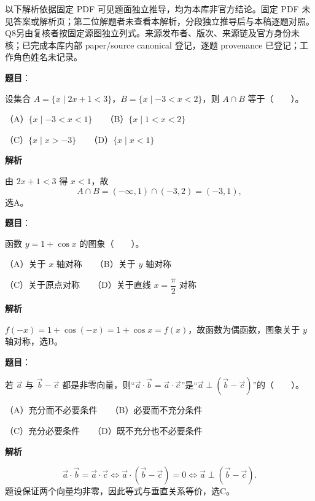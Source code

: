 

\begin{gktip}
以下解析依据固定 PDF 可见题面独立推导，均为本库非官方结论。固定 PDF 未见答案或解析页；第二位解题者未查看本解析，分段独立推导后与本稿逐题对照。Q8另由复核者按固定源图独立列式。来源发布者、版次、来源链及官方身份未核；已完成本库内部 paper/source canonical 登记，逐题 provenance 已登记；工作角色姓名未记录。
\end{gktip}

\begin{answer}

\textbf{题目}：

设集合 $A=\{x\mid 2x+1<3\}$，$B=\{x\mid -3<x<2\}$，则 $A\cap B$ 等于\mbox{（　　）}。

（A）$\{x\mid -3<x<1\}$　　（B）$\{x\mid 1<x<2\}$

（C）$\{x\mid x>-3\}$　　（D）$\{x\mid x<1\}$

\textbf{解析}

由 $2x+1<3$ 得 $x<1$，故
\nopagebreak[4]
\[
A\cap B=(-\infty,1)\cap(-3,2)=(-3,1),
\]
选A。


\end{answer}
\begin{answer}

\textbf{题目}：

函数 $y=1+\cos x$ 的图象\mbox{（　　）}。

（A）关于 $x$ 轴对称　　（B）关于 $y$ 轴对称

（C）关于原点对称　　（D）关于直线 $x=\dfrac{\pi}{2}$ 对称

\textbf{解析}

$f(-x)=1+\cos(-x)=1+\cos x=f(x)$，故函数为偶函数，图象关于 $y$ 轴对称，选B。


\end{answer}
\begin{answer}

\textbf{题目}：

若 $\vec a$ 与 $\vec b-\vec c$ 都是非零向量，则“$\vec a\cdot\vec b=\vec a\cdot\vec c$”是“$\vec a\perp(\vec b-\vec c)$”的\mbox{（　　）}。

（A）充分而不必要条件　　（B）必要而不充分条件

（C）充分必要条件　　（D）既不充分也不必要条件

\textbf{解析}

\nopagebreak[4]
\[
\vec a\cdot\vec b=\vec a\cdot\vec c
\iff \vec a\cdot(\vec b-\vec c)=0
\iff \vec a\perp(\vec b-\vec c).
\]
题设保证两个向量均非零，因此等式与垂直关系等价，选C。


\end{answer}
